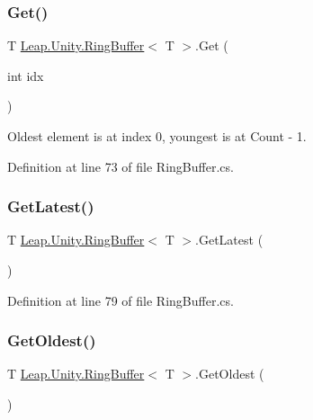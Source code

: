 \subsubsection{\texorpdfstring{Get()}{Get()}}
{\footnotesize\ttfamily T \mbox{\hyperlink{class_leap_1_1_unity_1_1_ring_buffer}{Leap.\+Unity.\+Ring\+Buffer}}$<$ T $>$.Get (\begin{DoxyParamCaption}\item[{int}]{idx }\end{DoxyParamCaption})}



Oldest element is at index 0, youngest is at Count -\/ 1. 



Definition at line 73 of file Ring\+Buffer.\+cs.

\mbox{\label{class_leap_1_1_unity_1_1_ring_buffer_a3a0c08b9bbf58d09f22f8b5cccd7bcb9}} 
\subsubsection{\texorpdfstring{GetLatest()}{GetLatest()}}
{\footnotesize\ttfamily T \mbox{\hyperlink{class_leap_1_1_unity_1_1_ring_buffer}{Leap.\+Unity.\+Ring\+Buffer}}$<$ T $>$.Get\+Latest (\begin{DoxyParamCaption}{ }\end{DoxyParamCaption})}



Definition at line 79 of file Ring\+Buffer.\+cs.

\mbox{\label{class_leap_1_1_unity_1_1_ring_buffer_ad5ba9a1ac565279534e9ff9bf0fcd7a4}} 
\subsubsection{\texorpdfstring{GetOldest()}{GetOldest()}}
{\footnotesize\ttfamily T \mbox{\hyperlink{class_leap_1_1_unity_1_1_ring_buffer}{Leap.\+Unity.\+Ring\+Buffer}}$<$ T $>$.Get\+Oldest (\begin{DoxyParamCaption}{ }\end{DoxyParamCaption})}




